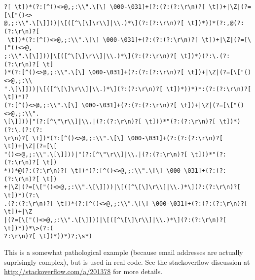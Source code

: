 \documentclass[]{book}
\begin{document}
\begin{verbatim}
?[ \t])*(?:[^()<>@,;:\\".\[\] \000-\031]+(?:(?:(?:\r\n)?[ \t])+|\Z|(?=[\["()<>
@,;:\\".\[\]]))|\[([^\[\]\r\\]|\\.)*\](?:(?:\r\n)?[ \t])*))*(?:,@(?:(?:\r\n)?[
 \t])*(?:[^()<>@,;:\\".\[\] \000-\031]+(?:(?:(?:\r\n)?[ \t])+|\Z|(?=[\["()<>@,
;:\\".\[\]]))|\[([^\[\]\r\\]|\\.)*\](?:(?:\r\n)?[ \t])*)(?:\.(?:(?:\r\n)?[ \t]
)*(?:[^()<>@,;:\\".\[\] \000-\031]+(?:(?:(?:\r\n)?[ \t])+|\Z|(?=[\["()<>@,;:\\
".\[\]]))|\[([^\[\]\r\\]|\\.)*\](?:(?:\r\n)?[ \t])*))*)*:(?:(?:\r\n)?[ \t])*)?
(?:[^()<>@,;:\\".\[\] \000-\031]+(?:(?:(?:\r\n)?[ \t])+|\Z|(?=[\["()<>@,;:\\".
\[\]]))|"(?:[^\"\r\\]|\\.|(?:(?:\r\n)?[ \t]))*"(?:(?:\r\n)?[ \t])*)(?:\.(?:(?:
\r\n)?[ \t])*(?:[^()<>@,;:\\".\[\] \000-\031]+(?:(?:(?:\r\n)?[ \t])+|\Z|(?=[\[
"()<>@,;:\\".\[\]]))|"(?:[^\"\r\\]|\\.|(?:(?:\r\n)?[ \t]))*"(?:(?:\r\n)?[ \t])
*))*@(?:(?:\r\n)?[ \t])*(?:[^()<>@,;:\\".\[\] \000-\031]+(?:(?:(?:\r\n)?[ \t])
+|\Z|(?=[\["()<>@,;:\\".\[\]]))|\[([^\[\]\r\\]|\\.)*\](?:(?:\r\n)?[ \t])*)(?:\
.(?:(?:\r\n)?[ \t])*(?:[^()<>@,;:\\".\[\] \000-\031]+(?:(?:(?:\r\n)?[ \t])+|\Z
|(?=[\["()<>@,;:\\".\[\]]))|\[([^\[\]\r\\]|\\.)*\](?:(?:\r\n)?[ \t])*))*\>(?:(
?:\r\n)?[ \t])*))*)?;\s*)
\end{verbatim}

This is a somewhat pathological example (because email addresses are
actually suprisingly complex), but is used in real code. See the
stackoverflow discussion at \url{http://stackoverflow.com/a/201378} for
more details.
\end{document}
